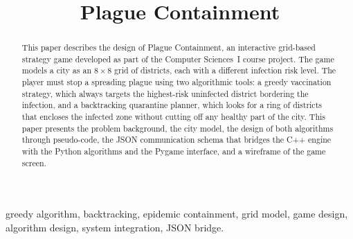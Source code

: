 \documentclass[conference]{IEEEtran}
\begin{document}
\title{Plague Containment}

\author{
  \and
  \and
}

\maketitle

\begin{abstract}
This paper describes the design of Plague Containment, an interactive grid-based
strategy game developed as part of the Computer Sciences~I course project. The
game models a city as an $8\times8$ grid of districts, each with a different
infection risk level. The player must stop a spreading plague using two
algorithmic tools: a greedy vaccination strategy, which always targets the
highest-risk uninfected district bordering the infection, and a backtracking
quarantine planner, which looks for a ring of districts that encloses the
infected zone without cutting off any healthy part of the city. This paper
presents the problem background, the city model, the design of both algorithms
through pseudo-code, the JSON communication schema that bridges the C++ engine
with the Python algorithms and the Pygame interface, and a wireframe of the
game screen.
\end{abstract}

\begin{IEEEkeywords}
greedy algorithm, backtracking, epidemic containment, grid model, game design,
algorithm design, system integration, JSON bridge.
\end{IEEEkeywords}

\end{document}
